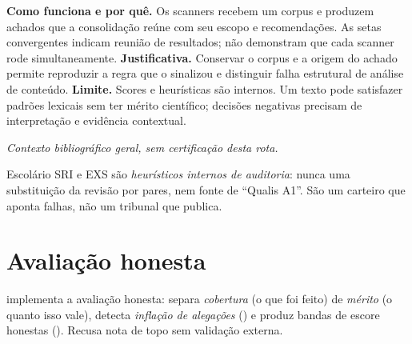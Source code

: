 \begin{descricao}
\textbf{Como funciona e por quê.} Os scanners recebem um corpus e produzem achados que a consolidação reúne com seu escopo e recomendações. As setas convergentes indicam reunião de resultados; não demonstram que cada scanner rode simultaneamente.
\textbf{Justificativa.} Conservar o corpus e a origem do achado permite reproduzir a regra que o sinalizou e distinguir falha estrutural de análise de conteúdo.
\textbf{Limite.} Scores e heurísticas são internos. Um texto pode satisfazer padrões lexicais sem ter mérito científico; decisões negativas precisam de interpretação e evidência contextual.
\end{descricao}


\noindent\textit{Contexto bibliográfico geral, sem certificação desta rota.} 


\begin{aviso}
Escolário SRI e EXS são \emph{heurísticos internos de auditoria}: nunca uma
substituição da revisão por pares, nem fonte de ``Qualis A1''. São um carteiro que
aponta falhas, não um tribunal que publica.
\end{aviso}

\clearpage
\section{Avaliação honesta}


\begin{descricao}
 implementa a avaliação honesta: separa
\emph{cobertura} (o que foi feito) de \emph{mérito} (o quanto isso vale), detecta
\emph{inflação de alegações} () e produz bandas de escore
honestas (). Recusa nota de topo sem validação externa.
\end{descricao}

